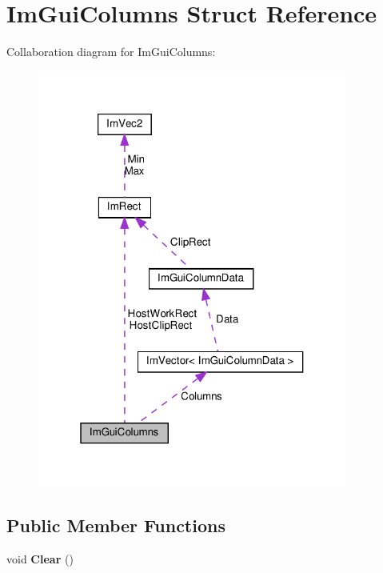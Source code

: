 \hypertarget{structImGuiColumns}{}\section{Im\+Gui\+Columns Struct Reference}
\label{structImGuiColumns}


Collaboration diagram for Im\+Gui\+Columns\+:\nopagebreak
\begin{figure}[H]
\begin{center}
\leavevmode
\includegraphics[width=289pt]{structImGuiColumns__coll__graph}
\end{center}
\end{figure}
\subsection*{Public Member Functions}
\begin{DoxyCompactItemize}
\item 
\mbox{\label{structImGuiColumns_aaf460b08462479e6f7353104282ab5c3}} 
void {\bfseries Clear} ()
\end{DoxyCompactItemize}
